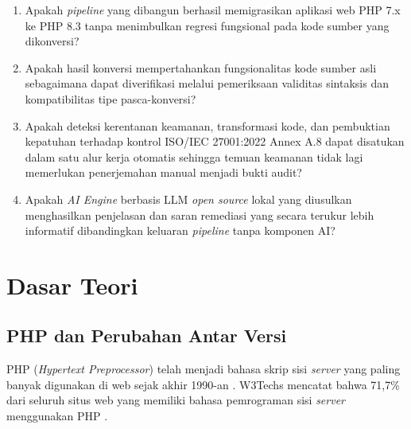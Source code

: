 \begin{enumerate}
    \item Apakah \textit{pipeline} yang dibangun berhasil memigrasikan 
    aplikasi web PHP 7.x ke PHP 8.3 tanpa menimbulkan regresi fungsional 
    pada kode sumber yang dikonversi?
    \item Apakah hasil konversi mempertahankan fungsionalitas kode sumber 
    asli sebagaimana dapat diverifikasi melalui pemeriksaan validitas 
    sintaksis dan kompatibilitas tipe pasca-konversi?
    \item Apakah deteksi kerentanan keamanan, transformasi kode, dan 
    pembuktian kepatuhan terhadap kontrol ISO/IEC 27001:2022 Annex A.8 
    dapat disatukan dalam satu alur kerja otomatis sehingga temuan 
    keamanan tidak lagi memerlukan penerjemahan manual menjadi bukti audit?
    \item Apakah \textit{AI Engine} berbasis LLM \textit{open source} 
    lokal yang diusulkan menghasilkan penjelasan dan saran remediasi yang 
    secara terukur lebih informatif dibandingkan keluaran \textit{pipeline} 
    tanpa komponen AI?
\end{enumerate}

    \section{Dasar Teori}

    \subsection{PHP dan Perubahan Antar Versi}

    PHP (\textit{Hypertext Preprocessor}) telah menjadi bahasa skrip sisi \textit{server} yang paling banyak digunakan di web sejak akhir 1990-an \cite{phpgroup_history}. W3Techs mencatat bahwa 71,7\% dari seluruh situs web yang memiliki bahasa pemrograman sisi \textit{server} menggunakan PHP \cite{w3techs2024php}.

